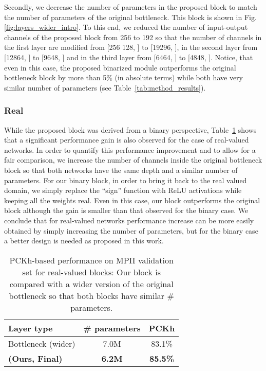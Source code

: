 \documentclass[10pt,journal,compsoc]{IEEEtran}
\begin{document}
Secondly, we decrease the number of parameters in the proposed block to match the number of parameters of the original bottleneck. This block is shown in Fig. \ref{fig:layers_wider_intro}. To this end, we reduced the number of input-output channels of the proposed block from 256 to 192 so that the number of channels in the first layer are modified from [256  128, ] to [19296, ], in the second layer from [12864, ] to [9648, ] and in the third layer from [6464, ] to [4848, ].  Notice, that even in this case, the proposed binarized module outperforms the original bottleneck block by more than 5\% (in absolute terms) while both have very similar number of parameters (see Table~\ref{tab:method_results}). 	

\subsubsection{Real} \label{sec:real}

While the proposed block was derived from a binary perspective, Table~\ref{tab:real} shows that a significant performance gain is also observed for the case of real-valued networks. In order to quantify this performance improvement and to allow for a fair comparison, we increase the number of channels inside the original bottleneck block so that both networks have the same depth and a similar number of parameters. {\color{black} For our binary block, in order to bring it back to the real valued domain, we simply replace the ``sign'' function with ReLU activations while keeping all the weights real.} Even in this case, our block outperforms the original block although the gain is smaller than that observed for the binary case. We conclude that for real-valued networks performance increase can be more easily obtained by simply increasing the number of parameters, but for the binary case a better design is needed as proposed in this work.

\begin{table}[!htbp]
    \renewcommand{\arraystretch}{1.3}
    \caption{PCKh-based performance on MPII validation set for real-valued blocks: Our block is compared with a wider version of the original bottleneck so that both blocks have similar \# parameters.}
    \label{tab:real}
    \centering
    \begin{tabular}{|l|c|c|}
        \hline
        Layer type             & \# parameters & PCKh            \\
        \hline\hline
        Bottleneck (wider)     & 7.0M          & 83.1\%          \\
        \hline
        \textbf{(Ours, Final)} & \textbf{6.2M} & \textbf{85.5\%} \\
        \hline
    \end{tabular}
\end{table}
\end{document}
